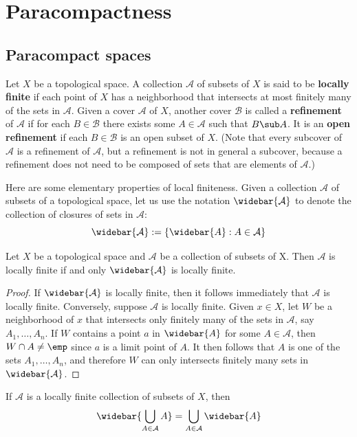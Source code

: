 \section{Paracompactness}
\subsection{Paracompact spaces}
Let $X$ be a topological space. A collection $\mathcal{A}$ of subsets of $X$ is said to be \textbf{locally finite} if each point of $X$ has a neighborhood that intersects at most finitely many of the sets in $\mathcal{A}$. Given a cover $\mathcal{A}$ of $X$, another cover $\mathcal{B}$ is called a \textbf{refinement} of $\mathcal{A}$ if for each $B\in\mathcal{B}$ there exists some $A\in\mathcal{A}$ such that $B\sub A$. It is an \textbf{open refinement} if each $B\in\mathcal{B}$ is an open subset of $X$. (Note that every subcover of $\mathcal{A}$ is a refinement of $\mathcal{A}$, but a refinement is not in general a subcover, because a refinement does not need to be composed of sets that are elements of $\mathcal{A}$.)\par
Here are some elementary properties of local finiteness. Given a collection $\mathcal{A}$ of subsets of a topological space, let us use the notation $\widebar{\mathcal{A}}$ to denote the collection of
closures of sets in $\mathcal{A}$:
\[\widebar{\mathcal{A}}:=\{\widebar{A}:A\in\mathcal{A}\}\]
\begin{lemma}\label{topo space locally iff closure is locally finite}
Let $X$ be a topological space and $\mathcal{A}$ be a collection of subsets of X. Then $\mathcal{A}$ is locally finite if and only $\widebar{\mathcal{A}}$ is locally finite.
\end{lemma}
\begin{proof}
If $\widebar{\mathcal{A}}$ is locally finite, then it follows immediately that $\mathcal{A}$ is locally finite. Conversely, suppose $\mathcal{A}$ is locally finite. Given $x\in X$, let $W$ be a neighborhood of $x$ that intersects only finitely many of the sets in $\mathcal{A}$, say $A_1,\dots,A_n$. If $W$ contains a point $a$ in $\widebar{A}$ for some $A\in\mathcal{A}$, then $W\cap A\neq\emp$ since $a$ is a limit point of $A$. It then follows that $A$ is one of the sets $A_1,\dots,A_n$, and therefore $W$ can only intersects finitely many sets in $\widebar{\mathcal{A}}$.
\end{proof}
\begin{lemma}\label{topo space locally finite family closure and union}
If $\mathcal{A}$ is a locally finite collection of subsets of $X$, then
\[\widebar{\bigcup_{A\in\mathcal{A}} A}=\bigcup_{A\in\mathcal{A}}\widebar{A}\]
\end{lemma}
